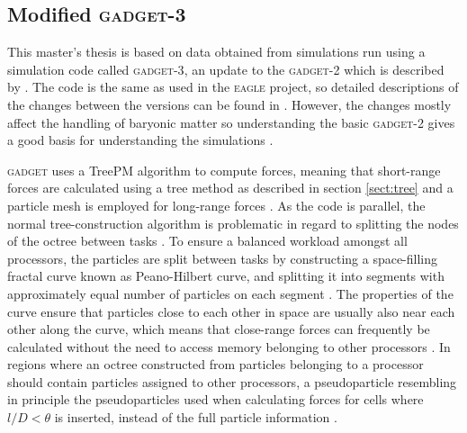 \documentclass[english, twoside]{HYgradu}
\begin{document}




\subsection{Modified \textsc{gadget-3}} \label{sect:gadget}
This master's thesis is based on data obtained from simulations run using a simulation code called \textsc{gadget-3}, an update to the \textsc{gadget-2} which is described by \citet{springel2005cosmological}. The code is the same as used in the \textsc{eagle} project, so detailed descriptions of the changes between the versions can be found in \citet{schaye2015eagle}. However, the changes mostly affect the handling of baryonic matter so understanding the basic \textsc{gadget-2} gives a good basis for understanding the simulations \citep{schaye2015eagle}.

\textsc{gadget} uses a TreePM algorithm to compute forces, meaning that short-range forces are calculated using a tree method as described in section \ref{sect:tree} and a particle mesh is employed for long-range forces \citep{springel2005cosmological}. As the code is parallel, the normal tree-construction algorithm is problematic in regard to splitting the nodes of the octree between tasks \citep{springel2005cosmological}. To ensure a balanced workload amongst all processors, the particles are split between tasks by constructing a space-filling fractal curve known as Peano-Hilbert curve, and splitting it into segments with approximately equal number of particles on each segment \citep{springel2005cosmological}. The properties of the curve ensure that particles close to each other in space are usually also near each other along the curve, which means that close-range forces can frequently be calculated without the need to access memory belonging to other processors \citep{springel2005cosmological}. In regions where an octree constructed from particles belonging to a processor should contain particles assigned to other processors, a pseudoparticle resembling in principle the pseudoparticles used when calculating forces for cells where $l/D < \theta$ is inserted, instead of the full particle information \citep{springel2005cosmological}.
\end{document}
